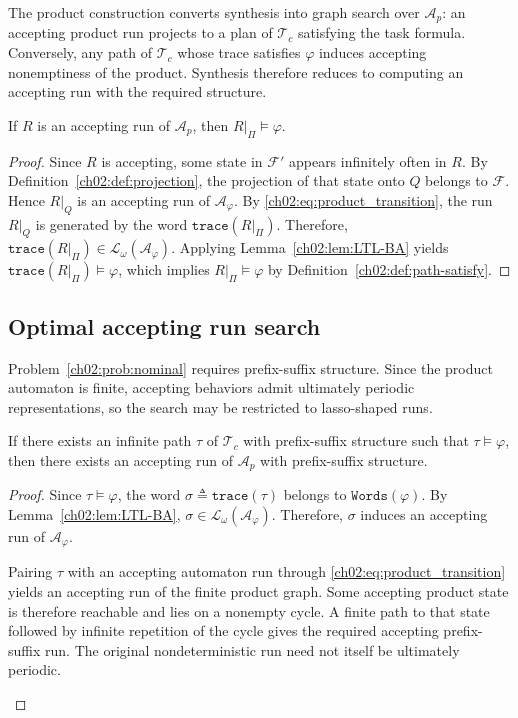The product construction converts synthesis into graph search over
$\mathcal{A}_p$: an accepting product run projects to a plan of
$\mathcal{T}_c$ satisfying the task formula.
Conversely, any path of $\mathcal{T}_c$ whose trace satisfies $\varphi$ induces
accepting nonemptiness of the product. Synthesis therefore reduces to computing
an accepting run with the required structure.

\begin{lemma}
\label{ch02:lem:satisfy}
If $R$ is an accepting run of $\mathcal{A}_p$, then
$R|_{\Pi} \models \varphi$.
\end{lemma}

\begin{proof}
Since $R$ is accepting, some state in $\mathcal{F}'$ appears infinitely often
in $R$. By Definition~\ref{ch02:def:projection}, the projection of that state
onto $Q$ belongs to $\mathcal{F}$. Hence $R|_{Q}$ is an accepting run of
$\mathcal{A}_{\varphi}$. By \eqref{ch02:eq:product_transition}, the run
$R|_{Q}$ is generated by the word
$\texttt{trace}(R|_{\Pi})$. Therefore,
$\texttt{trace}(R|_{\Pi})
\in \mathcal{L}_{\omega}(\mathcal{A}_{\varphi})$.
Applying Lemma~\ref{ch02:lem:LTL-BA} yields
$\texttt{trace}(R|_{\Pi}) \models \varphi$, which implies
$R|_{\Pi} \models \varphi$ by
Definition~\ref{ch02:def:path-satisfy}.
\end{proof}


\subsection{Optimal accepting run search}
\label{ch02:subsec:optimality}

Problem~\ref{ch02:prob:nominal} requires prefix-suffix structure. Since the
product automaton is finite, accepting behaviors admit ultimately periodic
representations, so the search may be restricted to lasso-shaped runs.

\begin{lemma}
\label{ch02:lem:prefix-suffix}
If there exists an infinite path $\tau$ of $\mathcal{T}_c$ with prefix-suffix
structure such that $\tau \models \varphi$, then there exists an accepting run
of $\mathcal{A}_p$ with prefix-suffix structure.
\end{lemma}

\begin{proof}
Since $\tau \models \varphi$, the word
$\sigma \triangleq \texttt{trace}(\tau)$ belongs to
$\texttt{Words}(\varphi)$. By Lemma~\ref{ch02:lem:LTL-BA},
$\sigma \in \mathcal{L}_{\omega}(\mathcal{A}_{\varphi})$. Therefore,
$\sigma$ induces an accepting run of $\mathcal{A}_{\varphi}$. \begin{revision}
Pairing $\tau$ with an accepting automaton run through
\eqref{ch02:eq:product_transition} yields an accepting run of the finite
product graph. Some accepting product state is therefore reachable and
lies on a nonempty cycle. A finite path to that state followed by infinite
repetition of the cycle gives the required accepting prefix-suffix run.
The original nondeterministic run need not itself be ultimately periodic.
\end{revision}
\end{proof}


